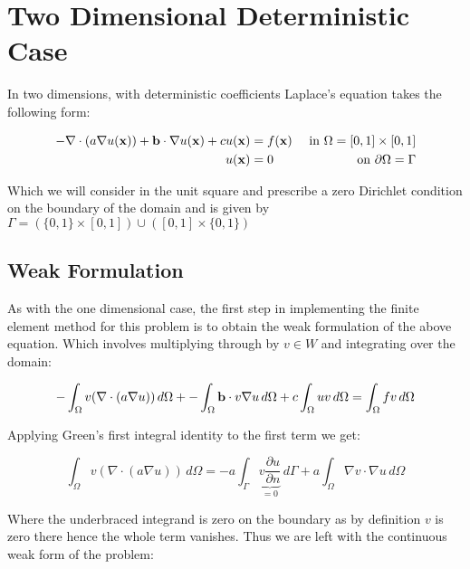 \chapter{Two Dimensional Deterministic Case}

In two dimensions, with deterministic coefficients Laplace's equation takes the following form:

\begin{equation}\label{eq:two-d-deterministic}
\begin{aligned}
    -\nabla\cdot(a\nabla u(\mathbf{x})) + \mathbf{b} \cdot \nabla u(\mathbf{x}) + c u(\mathbf{x}) &= f(\mathbf{x}) 
                               &\text{ in } \Omega = [0,1] \times [0,1] \\
    u(\mathbf{x}) &= 0 &\text{ on } \partial\Omega = \Gamma
\end{aligned}
\end{equation}

Which we will consider in the unit square and prescribe a zero Dirichlet condition on the boundary
of the domain and is given by $\Gamma = (\{0,1\} \times [0,1]) \cup ([0,1] \times \{0,1\})$

\section{Weak Formulation}


As with the one dimensional case, the first step in implementing the finite element method for this
problem is to obtain the weak formulation of the above equation. Which involves multiplying through
by $v \in W$ and integrating over the domain:

\begin{equation}
    -\int_{\Omega}{v(\nabla\cdot(a\nabla{u}))}\,d\Omega +
    -\int_{\Omega}\mathbf{b}\cdot v\nabla{u}\,d\Omega +
    c\int_{\Omega}uv\,d\Omega = \int_{\Omega}fv\,d\Omega
\end{equation}

Applying Green's first integral identity to the first term we get:

\begin{equation}
	\int_{\Omega}v(\nabla\cdot(a\nabla u))\, d\Omega = 
    -a\int_{\Gamma}\underbrace{v\frac{\partial{u}}{\partial{n}}}_{ =0} \,d\Gamma 
    + a\int_{\Omega}\nabla{v}\cdot\nabla{u}\,d\Omega
\end{equation}

Where the underbraced integrand is zero on the boundary as by definition $v$ is zero there
hence the whole term vanishes. Thus we are left with the continuous weak form of the problem:

